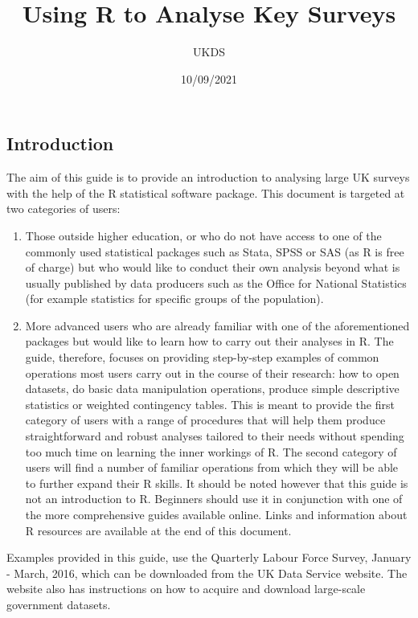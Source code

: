 \documentclass[
]{article}
\title{Using R to Analyse Key Surveys}
\author{UKDS}
\date{10/09/2021}
\begin{document}
\maketitle

\hypertarget{introduction}{%
\subsection{Introduction}\label{introduction}}

The aim of this guide is to provide an introduction to analysing large
UK surveys with the help of the R statistical software package. This
document is targeted at two categories of users:

\begin{enumerate}
\def\labelenumi{\arabic{enumi}.}
\item
  Those outside higher education, or who do not have access to one of
  the commonly used statistical packages such as Stata, SPSS or SAS (as
  R is free of charge) but who would like to conduct their own analysis
  beyond what is usually published by data producers such as the Office
  for National Statistics (for example statistics for specific groups of
  the population).
\item
  More advanced users who are already familiar with one of the
  aforementioned packages but would like to learn how to carry out their
  analyses in R. The guide, therefore, focuses on providing step-by-step
  examples of common operations most users carry out in the course of
  their research: how to open datasets, do basic data manipulation
  operations, produce simple descriptive statistics or weighted
  contingency tables. This is meant to provide the first category of
  users with a range of procedures that will help them produce
  straightforward and robust analyses tailored to their needs without
  spending too much time on learning the inner workings of R. The second
  category of users will find a number of familiar operations from which
  they will be able to further expand their R skills. It should be noted
  however that this guide is not an introduction to R. Beginners should
  use it in conjunction with one of the more comprehensive guides
  available online. Links and information about R resources are
  available at the end of this document.
\end{enumerate}

Examples provided in this guide, use the Quarterly Labour Force Survey,
January - March, 2016, which can be downloaded from the UK Data Service
website. The website also has instructions on how to acquire and
download large-scale government datasets.
\end{document}
